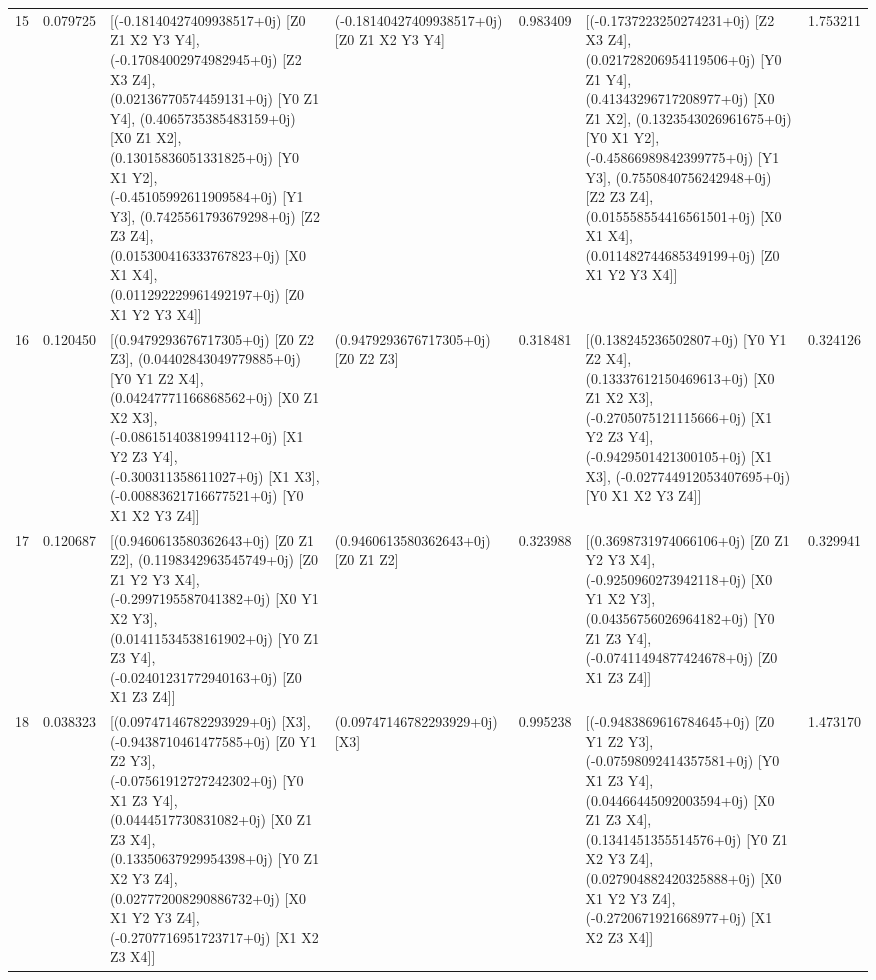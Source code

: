\begin{tabular}{rrllrlr}
      15 &      0.079725 &       [(-0.18140427409938517+0j) [Z0 Z1 X2 Y3 Y4], (-0.17084002974982945+0j) [Z2 X3 Z4], (0.02136770574459131+0j) [Y0 Z1 Y4], (0.4065735385483159+0j) [X0 Z1 X2], (0.13015836051331825+0j) [Y0 X1 Y2], (-0.45105992611909584+0j) [Y1 Y3], (0.7425561793679298+0j) [Z2 Z3 Z4], (0.015300416333767823+0j) [X0 X1 X4], (0.011292229961492197+0j) [Z0 X1 Y2 Y3 X4]] &   (-0.18140427409938517+0j) [Z0 Z1 X2 Y3 Y4] &      0.983409 &              [(-0.1737223250274231+0j) [Z2 X3 Z4], (0.021728206954119506+0j) [Y0 Z1 Y4], (0.41343296717208977+0j) [X0 Z1 X2], (0.1323543026961675+0j) [Y0 X1 Y2], (-0.45866989842399775+0j) [Y1 Y3], (0.7550840756242948+0j) [Z2 Z3 Z4], (0.015558554416561501+0j) [X0 X1 X4], (0.011482744685349199+0j) [Z0 X1 Y2 Y3 X4]] &  1.753211 \\
      16 &      0.120450 &                                                                                                                      [(0.9479293676717305+0j) [Z0 Z2 Z3], (0.04402843049779885+0j) [Y0 Y1 Z2 X4], (0.04247771166868562+0j) [X0 Z1 X2 X3], (-0.08615140381994112+0j) [X1 Y2 Z3 Y4], (-0.300311358611027+0j) [X1 X3], (-0.00883621716677521+0j) [Y0 X1 X2 Y3 Z4]] &           (0.9479293676717305+0j) [Z0 Z2 Z3] &      0.318481 &                                                                                                                      [(0.138245236502807+0j) [Y0 Y1 Z2 X4], (0.13337612150469613+0j) [X0 Z1 X2 X3], (-0.2705075121115666+0j) [X1 Y2 Z3 Y4], (-0.9429501421300105+0j) [X1 X3], (-0.027744912053407695+0j) [Y0 X1 X2 Y3 Z4]] &  0.324126 \\
      17 &      0.120687 &                                                                                                                                                         [(0.9460613580362643+0j) [Z0 Z1 Z2], (0.1198342963545749+0j) [Z0 Z1 Y2 Y3 X4], (-0.2997195587041382+0j) [X0 Y1 X2 Y3], (0.01411534538161902+0j) [Y0 Z1 Z3 Y4], (-0.02401231772940163+0j) [Z0 X1 Z3 Z4]] &           (0.9460613580362643+0j) [Z0 Z1 Z2] &      0.323988 &                                                                                                                                                        [(0.3698731974066106+0j) [Z0 Z1 Y2 Y3 X4], (-0.9250960273942118+0j) [X0 Y1 X2 Y3], (0.04356756026964182+0j) [Y0 Z1 Z3 Y4], (-0.07411494877424678+0j) [Z0 X1 Z3 Z4]] &  0.329941 \\
      18 &      0.038323 &                                                                          [(0.09747146782293929+0j) [X3], (-0.9438710461477585+0j) [Z0 Y1 Z2 Y3], (-0.07561912727242302+0j) [Y0 X1 Z3 Y4], (0.0444517730831082+0j) [X0 Z1 Z3 X4], (0.13350637929954398+0j) [Y0 Z1 X2 Y3 Z4], (0.027772008290886732+0j) [X0 X1 Y2 Y3 Z4], (-0.2707716951723717+0j) [X1 X2 Z3 X4]] &                (0.09747146782293929+0j) [X3] &      0.995238 &                                                                    [(-0.9483869616784645+0j) [Z0 Y1 Z2 Y3], (-0.07598092414357581+0j) [Y0 X1 Z3 Y4], (0.04466445092003594+0j) [X0 Z1 Z3 X4], (0.1341451355514576+0j) [Y0 Z1 X2 Y3 Z4], (0.027904882420325888+0j) [X0 X1 Y2 Y3 Z4], (-0.2720671921668977+0j) [X1 X2 Z3 X4]] &  1.473170 \\

\end{tabular}
